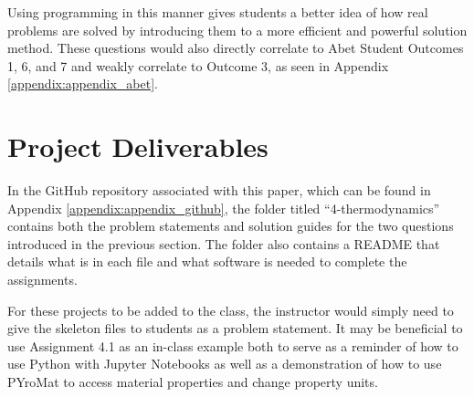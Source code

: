 Using programming in this manner gives students a better idea of how real problems are solved by introducing
them to a more efficient and powerful solution method. These questions would also directly correlate to Abet 
Student Outcomes 1, 6, and 7 and weakly correlate to Outcome 3, as seen in Appendix \ref{appendix:appendix_abet}.

\section{Project Deliverables}

In the GitHub repository associated with this paper, which can be found in Appendix \ref{appendix:appendix_github},
the folder titled ``4-thermodynamics'' contains both the problem statements and solution guides for the two questions
introduced in the previous section. The folder also contains a README that details what is in each file and 
what software is needed to complete the assignments. 

For these projects to be added to the class, the instructor would simply need to give the skeleton files to 
students as a problem statement. It may be beneficial to use Assignment 4.1 as an in-class example both to serve 
as a reminder of how to use Python with Jupyter Notebooks as well as a demonstration of how to use PYroMat to 
access material properties and change property units.
